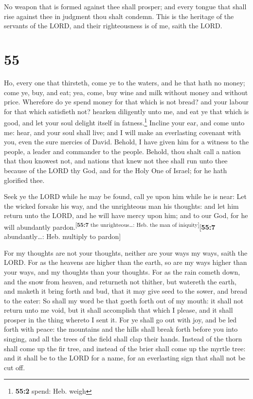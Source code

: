  No weapon that is formed against thee shall prosper; and
every tongue that shall rise against thee in judgment thou shalt
condemn. This is the heritage of the servants of the LORD, and their
righteousness is of me, saith the LORD.

\hypertarget{section-54}{%
\section{55}\label{section-54}}

 Ho, every one that thirsteth, come ye to the waters, and
he that hath no money; come ye, buy, and eat; yea, come, buy wine and
milk without money and without price.  Wherefore do ye
spend money for that which is not bread? and your labour for that which
satisfieth not? hearken diligently unto me, and eat ye that which is
good, and let your soul delight itself in fatness.\footnote{\textbf{55:2}
  spend: Heb. weigh}  Incline your ear, and come unto me:
hear, and your soul shall live; and I will make an everlasting covenant
with you, even the sure mercies of David.  Behold, I have
given him for a witness to the people, a leader and commander to the
people.  Behold, thou shalt call a nation that thou
knowest not, and nations that knew not thee shall run unto thee because
of the LORD thy God, and for the Holy One of Israel; for he hath
glorified thee.

 Seek ye the LORD while he may be found, call ye upon him
while he is near:  Let the wicked forsake his way, and the
unrighteous man his thoughts: and let him return unto the LORD, and he
will have mercy upon him; and to our God, for he will abundantly
pardon.\textsuperscript{{[}\textbf{55:7} the unrighteous\ldots: Heb. the
man of iniquity{]}}{[}\textbf{55:7} abundantly\ldots: Heb. multiply to
pardon{]}

 For my thoughts are not your thoughts, neither are your
ways my ways, saith the LORD.  For as the heavens are
higher than the earth, so are my ways higher than your ways, and my
thoughts than your thoughts.  For as the rain cometh
down, and the snow from heaven, and returneth not thither, but watereth
the earth, and maketh it bring forth and bud, that it may give seed to
the sower, and bread to the eater:  So shall my word be
that goeth forth out of my mouth: it shall not return unto me void, but
it shall accomplish that which I please, and it shall prosper in the
thing whereto I sent it.  For ye shall go out with joy,
and be led forth with peace: the mountains and the hills shall break
forth before you into singing, and all the trees of the field shall clap
their hands.  Instead of the thorn shall come up the fir
tree, and instead of the brier shall come up the myrtle tree: and it
shall be to the LORD for a name, for an everlasting sign that shall not
be cut off.

